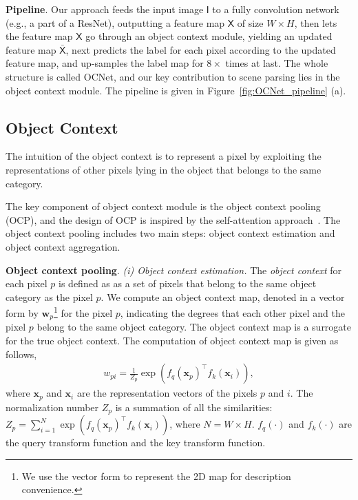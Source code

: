 \documentclass[10pt,twocolumn,letterpaper]{article}
\begin{document}
\vspace{.1cm}
\noindent\textbf{Pipeline}.
Our approach feeds the input image $\mathsf{I}$
to a fully convolution network (e.g., a part of a ResNet),
outputting a feature map $\mathsf{X}$ of size $ W\times H$,
then lets the feature map $\mathsf{X}$ go through an object context module,
yielding an updated feature map $\bar{\mathsf{X}}$,
next predicts the label for each pixel according to the updated feature map,
and up-samples the label map for $8 \times$ times at last.
The whole structure is called OCNet,
and our key contribution to scene parsing
lies in the object context module.
The pipeline is given
in Figure~\ref{fig:OCNet_pipeline} (a).

\subsection{Object Context}
The intuition of the object context
is to represent a pixel
by exploiting the representations of other pixels
lying in the object that belongs to the same category.

The key component of object context module is the object context pooling (OCP),
and the design of OCP is inspired
by the self-attention approach~\cite{lin2017structured, vaswani2017attention}.
The object context pooling includes two main steps:
object context estimation and
object context aggregation.


\vspace{.1cm}
\noindent\textbf{Object context pooling}.
\noindent\emph{(i) Object context estimation.}
The \emph{object context} for each pixel $p$
is defined as
as a set of pixels
that belong to the same object category
as the pixel $p$.
We compute an object context map, denoted in a vector form by $\mathbf{w}_p$\footnote{We use the vector form to represent the 2D map for description convenience.}
for the pixel $p$,
indicating the degrees that each other pixel and the pixel $p$ belong to the same object category.
The object context map is a surrogate for the true object context.
The computation of object context map is given as follows,
\begin{align}
w_{pi} =\frac{1}{Z_p} \exp(f_q(\mathbf{x}_p)^\top f_k(\mathbf{x}_i)),
\end{align}
where $\mathbf{x}_p$ and $\mathbf{x}_i$ are the representation vectors
of the pixels $p$ and $i$.
The normalization number $Z_p$ is a summation of all the similarities:
$Z_p = \sum_{i=1}^N \exp(f_q(\mathbf{x}_p)^\top f_k(\mathbf{x}_i))$,
where $N = W \times H$.
$f_q(\cdot)$ and $f_k(\cdot)$ are the query transform function and the key transform function.
\end{document}
